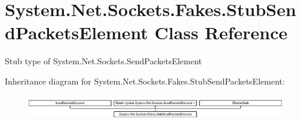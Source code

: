\hypertarget{class_system_1_1_net_1_1_sockets_1_1_fakes_1_1_stub_send_packets_element}{\section{System.\-Net.\-Sockets.\-Fakes.\-Stub\-Send\-Packets\-Element Class Reference}
\label{class_system_1_1_net_1_1_sockets_1_1_fakes_1_1_stub_send_packets_element}
}


Stub type of System.\-Net.\-Sockets.\-Send\-Packets\-Element 


Inheritance diagram for System.\-Net.\-Sockets.\-Fakes.\-Stub\-Send\-Packets\-Element\-:\begin{figure}[H]
\begin{center}
\leavevmode
\includegraphics[height=1.091618cm]{class_system_1_1_net_1_1_sockets_1_1_fakes_1_1_stub_send_packets_element}
\end{center}
\end{figure}
